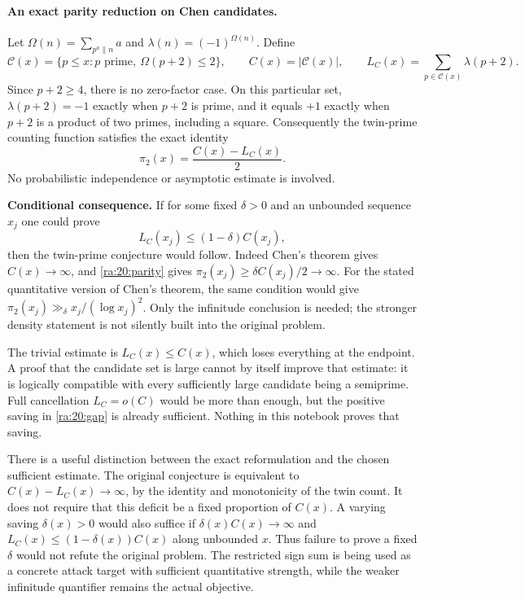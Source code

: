 \documentclass[11pt]{article}
\begin{document}
\paragraph{An exact parity reduction on Chen candidates.}
Let $\Omega(n)=\sum_{p^a\parallel n}a$ and
$\lambda(n)=(-1)^{\Omega(n)}$. Define
\[
 \mathcal C(x)=\{p\le x:p\text{ prime},\ \Omega(p+2)\le2\},\qquad
 C(x)=|\mathcal C(x)|,\qquad
 L_C(x)=\sum_{p\in\mathcal C(x)}\lambda(p+2).
\]
Since $p+2\ge4$, there is no zero-factor case. On this particular set,
$\lambda(p+2)=-1$ exactly when $p+2$ is prime, and it equals $+1$
exactly when $p+2$ is a product of two primes, including a square.
Consequently the twin-prime counting function satisfies the exact identity
\begin{equation}\label{ra:20:parity}
 \pi_2(x)=\frac{C(x)-L_C(x)}2.
\end{equation}
No probabilistic independence or asymptotic estimate is involved.

\textbf{Conditional consequence.} If for some fixed $\delta>0$ and
an unbounded sequence $x_j$ one could prove
\begin{equation}\label{ra:20:gap}
 L_C(x_j)\le(1-\delta)C(x_j),
\end{equation}
then the twin-prime conjecture would follow. Indeed Chen's theorem gives
$C(x)\to\infty$, and \eqref{ra:20:parity} gives
$\pi_2(x_j)\ge\delta C(x_j)/2\to\infty$.
For the stated quantitative version of Chen's theorem, the same condition
would give $\pi_2(x_j)\gg_\delta x_j/(\log x_j)^2$.
Only the infinitude conclusion is needed; the stronger density statement
is not silently built into the original problem.

The trivial estimate is $L_C(x)\le C(x)$, which loses everything at
the endpoint. A proof that the candidate set is large cannot by itself
improve that estimate: it is logically compatible with every sufficiently
large candidate being a semiprime. Full cancellation $L_C=o(C)$ would
be more than enough, but the positive saving in \eqref{ra:20:gap} is
already sufficient. Nothing in this notebook proves that saving.

There is a useful distinction between the exact reformulation and the
chosen sufficient estimate. The original conjecture is equivalent to
$C(x)-L_C(x)\to\infty$, by the identity and monotonicity of the twin
count. It does not require that this deficit be a fixed proportion of
$C(x)$. A varying saving $\delta(x)>0$ would also suffice if
$\delta(x)C(x)\to\infty$ and $L_C(x)\le(1-\delta(x))C(x)$ along
unbounded $x$. Thus failure to prove a fixed $\delta$ would not refute
the original problem. The restricted sign sum is being used as a
concrete attack target with sufficient quantitative strength, while the
weaker infinitude quantifier remains the actual objective.
\end{document}
